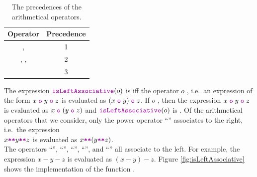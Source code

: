 \begin{table}[!ht]
  \centering
    \begin{tabular}{|c|c|}
    \hline
      Operator & Precedence \\
    \hline\hline
      \mytt{+}, \mytt{-} & 1 \\
    \hline
      \mytt{*}, \mytt{/}, \mytt{\%} & 2 \\
    \hline
      \mytt{**}           & 3 \\
    \hline
    \end{tabular}
  \caption{The precedences of the arithmetical operators.}
  \label{tab:precedence}
\end{table}

The expression $\mytt{isLeftAssociative}(o)$ is  iff the operator $o$ 
,  i.e.~an expression of the form $x \;\mytt{o}\; y \;\mytt{o}\; z$
is evaluated as  $(x \;\mytt{o}\; y) \;\mytt{o}\; z$.  If $o$ ,
 then the expression  $x \;\mytt{o}\; y \;\mytt{o}\; z$
is evaluated as  $x \;\mytt{o}\; (y \;\mytt{o}\; z)$ and $\mytt{isLeftAssociative}(o)$
is .  Of the arithmetical operators that we consider, only the power operator ``\mytt{**}'' 
associates to the right, i.e.~the expression
\\[0.2cm]
\hspace*{1.3cm}
$x \mytt{**} y \mytt{**} z$ \quad is evaluated as \quad $x \mytt{**} (y \mytt{**} z)$.
\\[0.2cm]
The operators 
``\mytt{+}'', ``\mytt{-}'', ``\mytt{*}'', ``\mytt{/}'', and ``\mytt{\%}'' 
all associate to the left.  For example, the expression
$x - y - z$ is evaluated as $(x - y) - z$.
Figure \ref{fig:isLeftAssociative} shows the implementation of the function .

